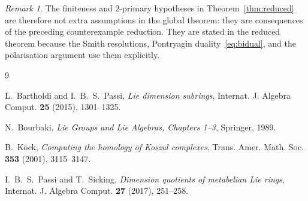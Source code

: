 \documentclass[11pt]{amsart}
\theoremstyle{remark}
\newtheorem{remark}[theorem]{Remark}
\begin{document}
\begin{remark}
The finiteness and $2$-primary hypotheses in
Theorem~\ref{thm:reduced} are therefore not extra assumptions in the
global theorem: they are consequences of the preceding counterexample
reduction.  They are stated in the reduced theorem because the Smith
resolutions, Pontryagin duality~\eqref{eq:bidual}, and the polarisation
argument use them explicitly.
\end{remark}

\begin{thebibliography}{9}

L.~Bartholdi and I.~B.~S.~Passi,
\emph{Lie dimension subrings},
Internat. J. Algebra Comput. \textbf{25} (2015), 1301--1325.

N.~Bourbaki,
\emph{Lie Groups and Lie Algebras, Chapters 1--3},
Springer, 1989.

B.~K\"ock,
\emph{Computing the homology of Koszul complexes},
Trans. Amer. Math. Soc. \textbf{353} (2001), 3115--3147.

I.~B.~S.~Passi and T.~Sicking,
\emph{Dimension quotients of metabelian Lie rings},
Internat. J. Algebra Comput. \textbf{27} (2017), 251--258.

\end{thebibliography}
\end{document}
